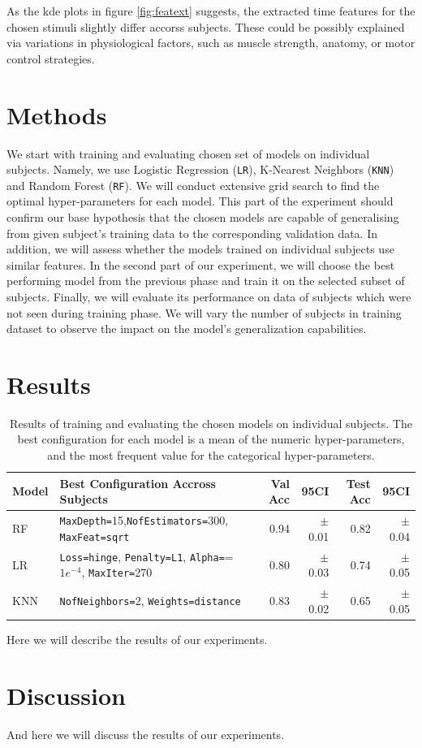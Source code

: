\documentclass[10pt]{article}
\begin{document}
As the kde plots in figure \ref{fig:featext} suggests, the extracted time features for the chosen stimuli slightly differ accorss subjects.
These could be possibly explained via variations in physiological factors, such as muscle strength, anatomy, or motor control strategies.

\section{Methods}
We start with training and evaluating chosen set of models on individual subjects. Namely, we use Logistic Regression (\texttt{LR}), K-Nearest Neighbors (\texttt{KNN})
and Random Forest (\texttt{RF}). We will conduct extensive grid search to find the optimal hyper-parameters for each model. 
This part of the experiment should confirm our base hypothesis that the chosen models are capable of generalising from given subject's training data to the corresponding validation data.
In addition, we will assess whether the models trained on individual subjects use similar features. In the second part of our experiment, we will choose the best performing model from the previous phase 
and train it on the selected  subset of subjects. Finally, we will evaluate its performance on data of subjects which were not seen during training phase.
We will vary the number of subjects in training dataset to observe the impact on the model's generalization capabilities.


\section{Results}
\begin{table}[!ht]
    \centering
    \begin{tabular}{llrrrr}
        \toprule
        \textbf{Model} & \textbf{Best Configuration Accross Subjects} & \textbf{Val Acc} & \textbf{95CI} & \textbf{Test Acc} & \textbf{95CI} \\
        \midrule
        RF & \texttt{MaxDepth=}15,\texttt{NofEstimators=}300, \texttt{MaxFeat=}\texttt{sqrt} & 0.94 & $\pm$0.01 & 0.82 & $\pm$0.04 \\
        LR & \texttt{Loss=hinge}, \texttt{Penalty=L1}, \texttt{Alpha=}=$1e^{-4}$, \texttt{MaxIter=}270 & 0.80 & $\pm$0.03 & 0.74 & $\pm$0.05 \\
        KNN & \texttt{NofNeighbors=}2, \texttt{Weights=distance} &0.83 & $\pm$0.02 & 0.65 & $\pm$0.05 \\
        \bottomrule
    \end{tabular}
    \caption{Results of training and evaluating the chosen models on individual subjects. The best configuration for each model is a mean of the numeric hyper-parameters, and the most frequent value for the categorical hyper-parameters.}
    \label{tab:results1}
\end{table}

Here we will describe the results of our experiments. %

\section{Discussion}
And here we will discuss the results of our experiments.

\newpage


\end{document}
